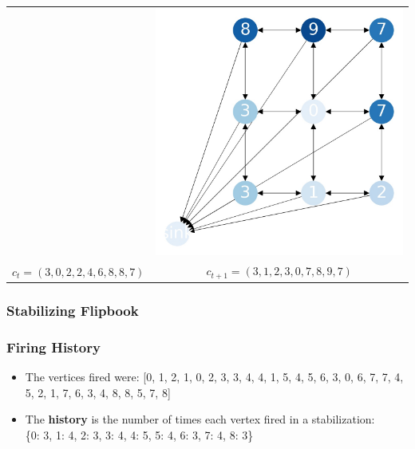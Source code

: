 \documentclass{beamer}
\begin{document}
\begin{frame}
\begin{tabular}{cc}
  &   \includegraphics[scale=0.15]{sandpile_13}\\



$c_t = (3,0,2,2,4,6,8,8,7)$  & $c_{t+1} = (3,1,2,3,0,7,8,9,7)$

\end{tabular}



\end{frame}



\begin{frame}
\frametitle{Stabilizing Flipbook}

\end{frame}


\begin{frame}
\frametitle{Firing History}
  \begin{itemize}
    \item The vertices fired were: [0, 1, 2, 1, 0, 2, 3, 3, 4, 4, 1, 5, 4, 5, 6, 3, 0, 6, 7, 7, 4, 5, 2, 1, 7, 6, 3, 4, 8, 8, 5, 7, 8]
    \item The \textbf{history} is the number of times each vertex fired in a stabilization:\\
    \{0: 3, 1: 4, 2: 3, 3: 4, 4: 5, 5: 4, 6: 3, 7: 4, 8: 3\}
  \end{itemize}
\end{frame}
\end{document}
